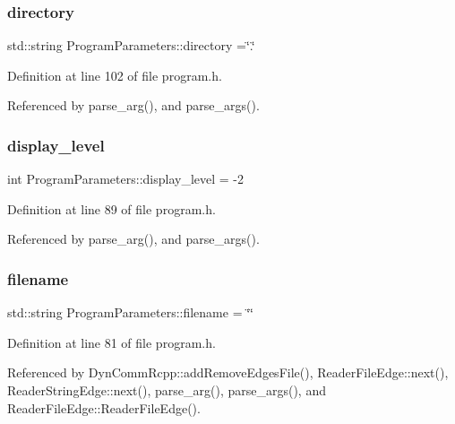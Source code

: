 \subsubsection{\texorpdfstring{directory}{directory}}
{\footnotesize\ttfamily std\+::string Program\+Parameters\+::directory =\char`\"{}.\char`\"{}}



Definition at line 102 of file program.\+h.



Referenced by parse\+\_\+arg(), and parse\+\_\+args().

\mbox{\label{structProgramParameters_a15ad41dc8bb6e6c43ac4a124b6f03652}} 
\subsubsection{\texorpdfstring{display\+\_\+level}{display\_level}}
{\footnotesize\ttfamily int Program\+Parameters\+::display\+\_\+level = -\/2}



Definition at line 89 of file program.\+h.



Referenced by parse\+\_\+arg(), and parse\+\_\+args().

\mbox{\label{structProgramParameters_af8cc2fe608d37b7dcaa36dafe9b8dbc4}} 
\subsubsection{\texorpdfstring{filename}{filename}}
{\footnotesize\ttfamily std\+::string Program\+Parameters\+::filename = \char`\"{}\char`\"{}}



Definition at line 81 of file program.\+h.



Referenced by Dyn\+Comm\+Rcpp\+::add\+Remove\+Edges\+File(), Reader\+File\+Edge\+::next(), Reader\+String\+Edge\+::next(), parse\+\_\+arg(), parse\+\_\+args(), and Reader\+File\+Edge\+::\+Reader\+File\+Edge().

